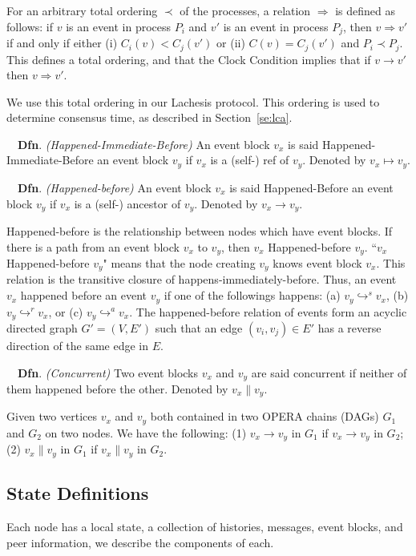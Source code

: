 \documentclass{article}
\newcommand{\dfnn}[2]{$\quad$\textbf{Dfn}. \emph{(#1)} {#2}}
\newcommand{\eself}{\hookrightarrow^{s}}
\newcommand{\eref}{\hookrightarrow^{r}}
\newcommand{\eancestor}{\hookrightarrow^{a}}
\newcommand{\hibefore}{\mapsto}
\newcommand{\hbefore}{\rightarrow}
\newcommand{\concur}{\parallel}
\begin{document}
For an arbitrary total ordering $\prec$ of the processes, a relation $\Rightarrow$ is defined as follows: if $v$ is an event in process $P_i$ and $v'$ is an event in process $P_j$, then $v \Rightarrow v'$ if and only if either (i) $C_i(v) < C_j(v')$ or (ii) $C(v)= C_j(v')$ and $P_i \prec P_j$. This defines a total ordering, and that the Clock Condition implies that if $v \rightarrow v'$ then $v \Rightarrow v'$. 

We use this total ordering in our Lachesis protocol. This ordering is used to determine consensus time, as described in Section~\ref{se:lca}.

\dfnn{Happened-Immediate-Before}{An event block $v_x$ is said Happened-Immediate-Before an event block $v_y$ if $v_x$ is a (self-) ref of $v_y$. Denoted by $v_x \hibefore v_y$.}

\dfnn{Happened-before}{An event block $v_x$ is said Happened-Before an event block $v_y$ if $v_x$ is a (self-) ancestor of $v_y$. Denoted by $v_x \hbefore v_y$.}

 Happened-before is the relationship between nodes which have event blocks. If there is a path from an event block $v_x$ to $v_y$, then $v_x$ Happened-before $v_y$. ``$v_x$ Happened-before $v_y$" means that the node creating $v_y$ knows event block $v_x$. This relation is the transitive closure of happens-immediately-before. Thus, an event $v_x$ happened before an event $v_y$ if one of the followings happens: (a) $v_y \eself v_x$, (b) $v_y \eref v_x$,  or (c) $v_y \eancestor v_x$. The happened-before relation of events form an acyclic directed graph $G' = (V, E')$ such that an edge $(v_i,v_j) \in E'$ has a reverse direction of the same edge in $E$.

\dfnn{Concurrent}{Two event blocks $v_x$ and $v_y$ are said concurrent if neither of them  happened before the other. Denoted by $v_x \concur v_y$.}
	
	Given two vertices $v_x$ and $v_y$ both contained in two OPERA chains (DAGs) $G_1$ and $G_2$ on two nodes. We have the following: 
	(1) $v_x \hbefore v_y$ in $G_1$ if $v_x \hbefore v_y$ in $G_2$; (2)
	$v_x \concur v_y$ in $G_1$ if $v_x \concur v_y$ in $G_2$.

\subsection{State Definitions}

Each node has a local state, a collection of histories, messages, event blocks, and peer information, we describe the components of each.
\end{document}
